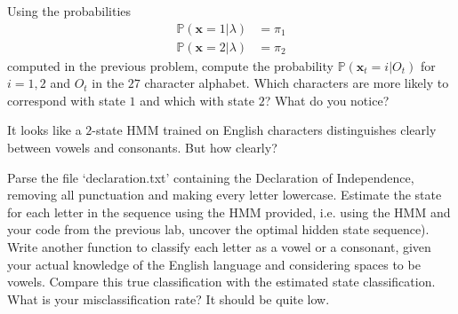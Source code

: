 \begin{problem}
Using the probabilities 
\begin{align*}
\mathbb{P}(\mathbf{x} = 1 | \lambda) & = \pi_{1} \\
\mathbb{P}(\mathbf{x} = 2 | \lambda) & = \pi_{2}
\end{align*}
computed in the previous problem, compute the probability $\mathbb{P}(\mathbf{x}_{t} = i | O_{t})$ for $i = 1,2$ and $O_{t}$ in the $27$ character alphabet. Which characters are more likely to correspond with state $1$ and which with state $2$? What do you notice?
\end{problem}
It looks like a $2$-state HMM trained on English characters distinguishes clearly between vowels and consonants. But how clearly?

\begin{problem}
Parse the file `declaration.txt' containing the Declaration of Independence, removing all punctuation and making every letter lowercase. Estimate the state for each letter in the sequence using the HMM provided, i.e. using the HMM and your code from the previous lab, uncover the optimal hidden state sequence). Write another function to classify each letter as a vowel or a consonant, given your actual knowledge of the English language and considering spaces to be vowels. Compare this true classification with the estimated state classification. What is your misclassification rate? It should be quite low.
\end{problem}
